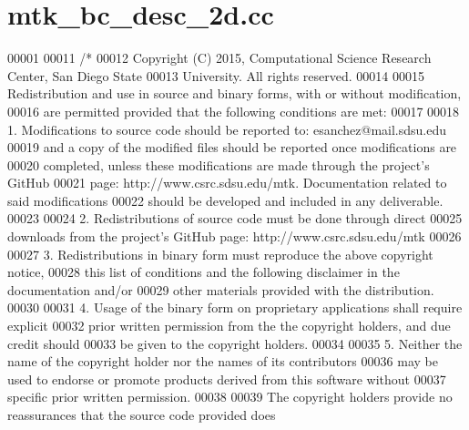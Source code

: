 \hypertarget{mtk__bc__desc__2d_8cc_source}{\section{mtk\+\_\+bc\+\_\+desc\+\_\+2d.\+cc}
\label{mtk__bc__desc__2d_8cc_source}
}

\begin{DoxyCode}
00001 
00011 \textcolor{comment}{/*}
00012 \textcolor{comment}{Copyright (C) 2015, Computational Science Research Center, San Diego State}
00013 \textcolor{comment}{University. All rights reserved.}
00014 \textcolor{comment}{}
00015 \textcolor{comment}{Redistribution and use in source and binary forms, with or without modification,}
00016 \textcolor{comment}{are permitted provided that the following conditions are met:}
00017 \textcolor{comment}{}
00018 \textcolor{comment}{1. Modifications to source code should be reported to: esanchez@mail.sdsu.edu}
00019 \textcolor{comment}{and a copy of the modified files should be reported once modifications are}
00020 \textcolor{comment}{completed, unless these modifications are made through the project's GitHub}
00021 \textcolor{comment}{page: http://www.csrc.sdsu.edu/mtk. Documentation related to said modifications}
00022 \textcolor{comment}{should be developed and included in any deliverable.}
00023 \textcolor{comment}{}
00024 \textcolor{comment}{2. Redistributions of source code must be done through direct}
00025 \textcolor{comment}{downloads from the project's GitHub page: http://www.csrc.sdsu.edu/mtk}
00026 \textcolor{comment}{}
00027 \textcolor{comment}{3. Redistributions in binary form must reproduce the above copyright notice,}
00028 \textcolor{comment}{this list of conditions and the following disclaimer in the documentation and/or}
00029 \textcolor{comment}{other materials provided with the distribution.}
00030 \textcolor{comment}{}
00031 \textcolor{comment}{4. Usage of the binary form on proprietary applications shall require explicit}
00032 \textcolor{comment}{prior written permission from the the copyright holders, and due credit should}
00033 \textcolor{comment}{be given to the copyright holders.}
00034 \textcolor{comment}{}
00035 \textcolor{comment}{5. Neither the name of the copyright holder nor the names of its contributors}
00036 \textcolor{comment}{may be used to endorse or promote products derived from this software without}
00037 \textcolor{comment}{specific prior written permission.}
00038 \textcolor{comment}{}
00039 \textcolor{comment}{The copyright holders provide no reassurances that the source code provided does}

\end{DoxyCode}
